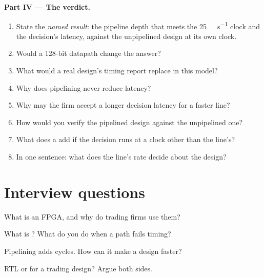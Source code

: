 \begin{problem}
\medskip\noindent\textbf{Part IV --- The verdict.}
\begin{enumerate}[resume]
\item State the \emph{named result}: the pipeline depth that meets the \qty{25}{\giga\bit\per\second} clock and the decision's latency, against
  the unpipelined design at its own clock.
\item Would a 128-bit datapath change the answer?
\item What would a real design's timing report replace in this model?
\item Why does pipelining never reduce latency?
\item Why may the firm accept a longer decision latency for a faster line?
\item How would you verify the pipelined design against the unpipelined one?
\item What does a  add if the decision runs at a clock other than the line's?
\item In one sentence: what does the line's rate decide about the design?
\end{enumerate}
\end{problem}

\section{Interview questions}

\begin{interviewq}\label{iq:nw:programmable-hardware-i-architecture-and-toolchain:1}
What is an FPGA, and why do trading firms use them?
\end{interviewq}

\begin{interviewq}\label{iq:nw:programmable-hardware-i-architecture-and-toolchain:2}
What is ? What do you do when a path fails timing?
\end{interviewq}

\begin{interviewq}\label{iq:nw:programmable-hardware-i-architecture-and-toolchain:3}
Pipelining adds cycles. How can it make a design faster?
\end{interviewq}

\begin{interviewq}\label{iq:nw:programmable-hardware-i-architecture-and-toolchain:4}
RTL or  for a trading design? Argue both sides.
\end{interviewq}

